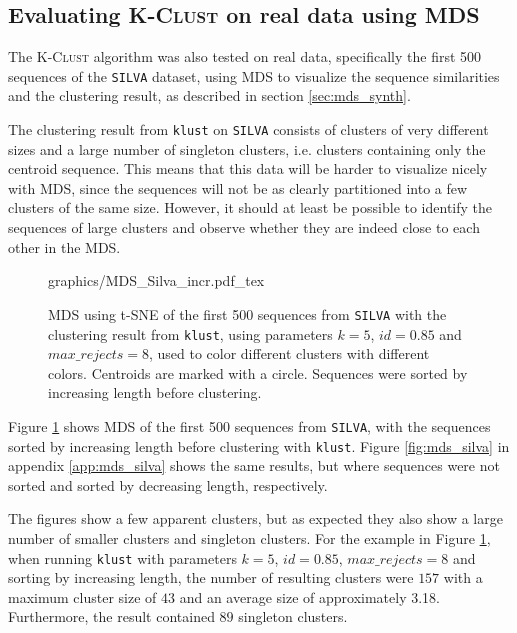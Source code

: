 \subsection{Evaluating \textsc{K-Clust} on real data using MDS}
\label{sec:mds_real_data}

The \textsc{K-Clust} algorithm was also tested on real data, specifically the
first 500 sequences of the \texttt{SILVA} dataset, using MDS to visualize the
sequence similarities and the clustering result, as described in section
\ref{sec:mds_synth}.


The clustering result from \texttt{klust} on \texttt{SILVA} consists of
clusters of very different sizes and a large number of singleton clusters, i.e.
clusters containing only the centroid sequence. This means that this data will
be harder to visualize nicely with MDS, since the sequences will not be as
clearly partitioned into a few clusters of the same size. However, it should at
least be possible to identify the sequences of large clusters and observe
whether they are indeed close to each other in the MDS.

\begin{figure}[H]
  \centering
  \def\svgwidth{\columnwidth}
  {graphics/MDS_Silva_incr.pdf_tex}
  \caption{MDS using t-SNE of the first 500 sequences from \texttt{SILVA} with
    the clustering result from \texttt{klust}, using parameters $k=5$,
    $id=0.85$ and $max\_rejects=8$, used to color different clusters with
    different colors. Centroids are marked with a circle. Sequences were sorted
    by increasing length before clustering.}
  \label{fig:mds_silva_sort_incr}
\end{figure}

Figure \ref{fig:mds_silva_sort_incr} shows MDS of the first 500 sequences from
\texttt{SILVA}, with the sequences sorted by increasing length before
clustering with \texttt{klust}. Figure \ref{fig:mds_silva} in appendix
\ref{app:mds_silva} shows the same results, but where sequences were not sorted
and sorted by decreasing length, respectively.

The figures show a few apparent clusters, but as expected they also show a
large number of smaller clusters and singleton clusters. For the example in
Figure \ref{fig:mds_silva_sort_incr}, when running \texttt{klust} with
parameters $k=5$, $id=0.85$, $max\_rejects=8$ and sorting by increasing length,
the number of resulting clusters were $157$ with a maximum cluster size of $43$
and an average size of approximately \num{3.18}. Furthermore, the result
contained $89$ singleton clusters.

